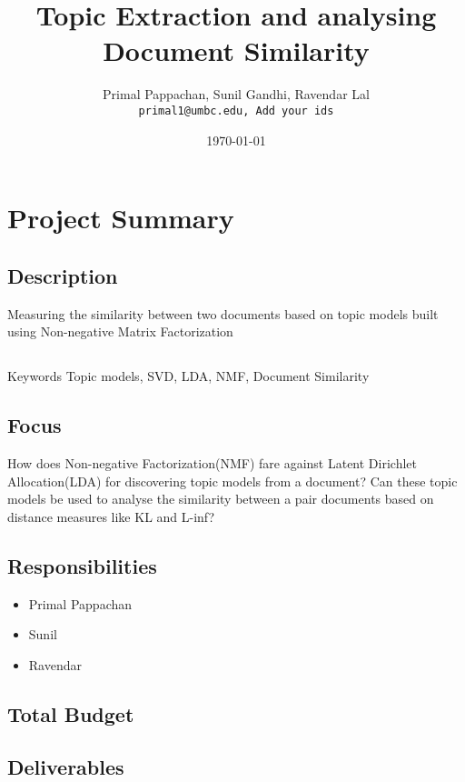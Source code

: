 \documentclass[a4paper,11pt]{article}
\begin{document}

\title{Topic Extraction and analysing Document Similarity}
\author{Primal Pappachan, Sunil Gandhi, Ravendar Lal \\ 
\texttt{primal1@umbc.edu, Add your ids}}
\date{\today}
\maketitle


\section{Project Summary}
\subsection{Description}
Measuring the similarity between two documents based on topic models built using Non-negative Matrix Factorization 
\subsection{}Keywords
Topic models, SVD, LDA, NMF, Document Similarity 
\subsection{Focus}
How does Non-negative Factorization(NMF) fare against Latent Dirichlet Allocation(LDA) for discovering topic models from a document? Can these topic models be used to analyse the similarity between a pair documents based on distance measures like KL and L-inf?
\subsection{Responsibilities}
\begin{itemize}
\item Primal Pappachan
\item Sunil
\item Ravendar
\end{itemize}


\subsection{Total Budget} 

\subsection{Deliverables}
\end{document}
